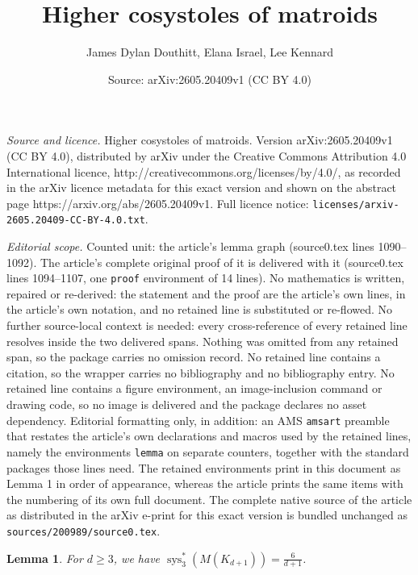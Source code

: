 \documentclass[10pt,a4paper]{amsart}
\title{Higher cosystoles of matroids}
\author{James Dylan Douthitt, Elana Israel, Lee Kennard}
\date{Source: arXiv:2605.20409v1 (CC BY 4.0)}
\newtheorem{lemma}{Lemma}
\DeclareMathOperator{\sys}{sys}
\begin{document}
\maketitle

\noindent\emph{Source and licence.} Higher cosystoles of matroids. Version arXiv:2605.20409v1 (CC BY 4.0), distributed by arXiv under the Creative Commons Attribution 4.0 International licence, http://creativecommons.org/licenses/by/4.0/, as recorded in the arXiv licence metadata for this exact version and shown on the abstract page https://arxiv.org/abs/2605.20409v1. Full licence notice: \texttt{licenses/arxiv-2605.20409-CC-BY-4.0.txt}.\par\smallskip

\noindent\textit{Editorial scope.} Counted unit: the article's lemma graph (source0.tex lines 1090--1092). The article's complete original proof of it is delivered with it (source0.tex lines 1094--1107, one \texttt{proof} environment of 14 lines). No mathematics is written, repaired or re-derived: the statement and the proof are the article's own lines, in the article's own notation, and no retained line is substituted or re-flowed.  No further source-local context is needed: every cross-reference of every retained line resolves inside the two delivered spans.  Nothing was omitted from any retained span, so the package carries no omission record.  No retained line contains a citation, so the wrapper carries no bibliography and no bibliography entry.  No retained line contains a figure environment, an image-inclusion command or drawing code, so no image is delivered and the package declares no asset dependency.  Editorial formatting only, in addition: an AMS \texttt{amsart} preamble that restates the article's own declarations and macros used by the retained lines, namely the environments \texttt{lemma} on separate counters, together with the standard packages those lines need.  The retained environments print in this document as Lemma 1 in order of appearance, whereas the article prints the same items with the numbering of its own full document.  The complete native source of the article as distributed in the arXiv e-print for this exact version is bundled unchanged as \texttt{sources/200989/source0.tex}.
\begin{lemma}\label{lem:3sys graph}%
For $d \geq 3$, we have $\sys_3^*(M(K_{d+1})) = \frac{6}{d+1}$.
\end{lemma}
\end{document}
